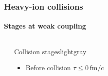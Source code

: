 \documentclass[aspectratio=169,11pt,usenames,dvipsnames]{beamer}
\begin{document}
\begin{frame}
    \frametitle{Heavy-ion collisions}
    \framesubtitle{Stages at weak coupling}
    \vspace{-15pt}
    \begin{columns}[onlytextwidth,t]
            \begin{center}
                \vspace{-5pt}
            \end{center}
            \vspace{10pt}
            \begin{center}
            \begin{custombox2}{\color{normal}Collision stages}{lightgray}
                \small
                \begin{varwidth}{0.74\textwidth}
                \begin{itemize}\itemsep0em 
                    \item {Before collision {\scriptsize $\tau\leq 0\,\mathrm{fm/c}$}}\\[1pt]

\end{itemize}
\end{varwidth}
\end{custombox2}
\end{center}
\end{columns}
\end{frame}
\end{document}
